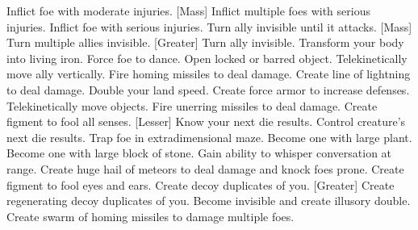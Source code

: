     {Inflict foe with moderate injuries.}
[Mass]
    {Inflict multiple foes with serious injuries.}
    {Inflict foe with serious injuries.}
    {Turn ally invisible until it attacks.}
[Mass]
    {Turn multiple allies invisible.}
[Greater]
    {Turn ally invisible.}
    {Transform your body into living iron.}
    {Force foe to dance.}
    {Open locked or barred object.}
    {Telekinetically move ally vertically.}
    {Fire homing missiles to deal damage.}
    {Create line of lightning to deal damage.}
    {Double your land speed.}
    {Create force armor to increase defenses.}
    {Telekinetically move objects.}
    {Fire unerring missiles to deal damage.}
    {Create figment to fool all senses.}
[Lesser]
    {Know your next die results.}
    {Control creature's next die results.}
    {Trap foe in extradimensional maze.}
    {Become one with large plant.}
    {Become one with large block of stone.}
    {Gain ability to whisper conversation at range.}
    {Create huge hail of meteors to deal damage and knock foes prone.}
    {Create figment to fool eyes and ears.}
    {Create decoy duplicates of you.}
[Greater]
    {Create regenerating decoy duplicates of you.}
    {Become invisible and create illusory double.}
    {Create swarm of homing missiles to damage multiple foes.}
